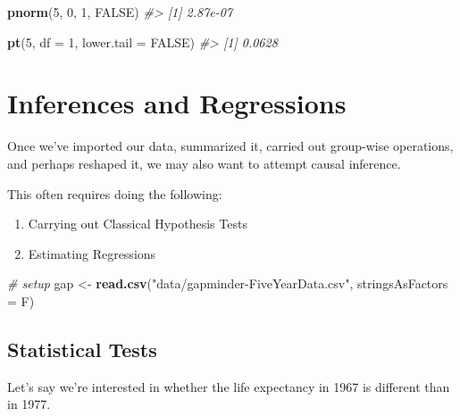 \documentclass[]{book}
\newenvironment{Shaded}{\begin{snugshade}}{\end{snugshade}}
\newcommand{\KeywordTok}[1]{\textcolor[rgb]{0.13,0.29,0.53}{\textbf{#1}}}
\newcommand{\DataTypeTok}[1]{\textcolor[rgb]{0.13,0.29,0.53}{#1}}
\newcommand{\DecValTok}[1]{\textcolor[rgb]{0.00,0.00,0.81}{#1}}
\newcommand{\StringTok}[1]{\textcolor[rgb]{0.31,0.60,0.02}{#1}}
\newcommand{\CommentTok}[1]{\textcolor[rgb]{0.56,0.35,0.01}{\textit{#1}}}
\newcommand{\OtherTok}[1]{\textcolor[rgb]{0.56,0.35,0.01}{#1}}
\newcommand{\OperatorTok}[1]{\textcolor[rgb]{0.81,0.36,0.00}{\textbf{#1}}}
\newcommand{\NormalTok}[1]{#1}
\providecommand{\tightlist}{%
  \setlength{\itemsep}{0pt}\setlength{\parskip}{0pt}}
\begin{document}
\begin{Shaded}
\begin{Highlighting}[]
\KeywordTok{pnorm}\NormalTok{(}\DecValTok{5}\NormalTok{, }\DecValTok{0}\NormalTok{, }\DecValTok{1}\NormalTok{, }\OtherTok{FALSE}\NormalTok{)}
\CommentTok{#> [1] 2.87e-07}

\KeywordTok{pt}\NormalTok{(}\DecValTok{5}\NormalTok{, }\DataTypeTok{df =} \DecValTok{1}\NormalTok{, }\DataTypeTok{lower.tail =} \OtherTok{FALSE}\NormalTok{)}
\CommentTok{#> [1] 0.0628}
\end{Highlighting}
\end{Shaded}

\section{Inferences and Regressions}\label{inferences-and-regressions}

Once we've imported our data, summarized it, carried out group-wise
operations, and perhaps reshaped it, we may also want to attempt causal
inference.

This often requires doing the following:

\begin{enumerate}
\def\labelenumi{\arabic{enumi})}
\tightlist
\item
  Carrying out Classical Hypothesis Tests
\item
  Estimating Regressions
\end{enumerate}

\begin{Shaded}
\begin{Highlighting}[]
\CommentTok{# setup}
\NormalTok{gap <-}\StringTok{ }\KeywordTok{read.csv}\NormalTok{(}\StringTok{"data/gapminder-FiveYearData.csv"}\NormalTok{, }\DataTypeTok{stringsAsFactors =}\NormalTok{ F)}
\end{Highlighting}
\end{Shaded}

\subsection{Statistical Tests}\label{statistical-tests}

Let's say we're interested in whether the life expectancy in 1967 is
different than in 1977.

\begin{Shaded}
\end{Shaded}
\end{document}
